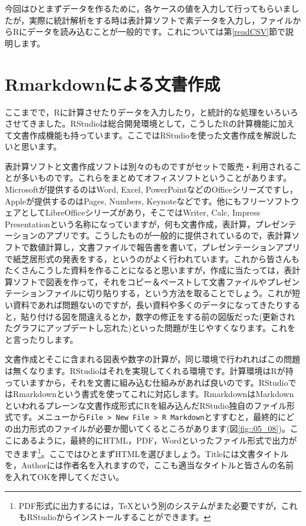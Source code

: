 \documentclass{ltjbook}
\begin{document}
今回はひとまずデータを作るために，各ケースの値を入力して行ってもらいましたが，実際に統計解析をする時は表計算ソフトで素データを入力し，ファイルからRにデータを読み込むことが一般的です。これについては第\ref{readCSV}節で説明します。

\section{Rmarkdownによる文書作成}
ここまでで，Rに計算させたりデータを入力したり，と統計的な処理をいろいろさせてきました。RStudioは総合開発環境として，こうしたRの計算機能に加えて文書作成機能も持っています。ここではRStudioを使った文書作成を解説したいと思います。

表計算ソフトと文書作成ソフトは別々のものですがセットで販売・利用されることが多いものです。これらをまとめてオフィスソフトということがあります。Microsoftが提供するのはWord, Excel, PowerPointなどのOfficeシリーズですし，Appleが提供するのはPages, Numbers, Keynoteなどです。他にもフリーソフトウェアとしてLibreOfficeシリーズがあり，そこではWriter, Calc, Impress Presentationという名称になっていますが，何も文書作成，表計算，プレゼンテーションのアプリです。こうしたものが一般的に提供されているので，表計算ソフトで数値計算し，文書ファイルで報告書を書いて，プレゼンテーションアプリで紙芝居形式の発表をする，というのがよく行われています。これから皆さんもたくさんこうした資料を作ることになると思いますが，作成に当たっては，表計算ソフトで図表を作って，それをコピー＆ペーストして文書ファイルやプレゼンテーションファイルに切り貼りする，という方法を取ることでしょう。これが短い資料であれば問題ないのですが，長い資料や多くのデータになってきたりすると，貼り付ける図を間違えるとか，数字の修正をする前の図版だった(更新されたグラフにアップデートし忘れた)といった問題が生じやすくなります。これをと言ったりします。

文書作成とそこに含まれる図表や数字の計算が，同じ環境で行われればこの問題は無くなります。RStudioはそれを実現してくれる環境です。計算環境はRが持っていますから，それを文書に組み込む仕組みがあれば良いのです。RStudioではRmarkdownという書式を使ってこれに対応します。RmarkdownはMarkdownといわれるプレーンな文書作成形式にRを組み込んだRStudio独自のファイル形式です。メニューから\verb|File > New File > R Markdown|とすすむと，最終的にどの出力形式のファイルが必要か聞いてくるところがあります(図\ref{fig::05_08})。ここにあるように，最終的にHTML，PDF，Wordといったファイル形式で出力ができます\footnote{PDF形式に出力するには，TeXという別のシステムがまた必要ですが，これもRStudioからインストールすることができます。}。ここではひとまずHTMLを選びましょう。Titleには文書タイトルを，Authorには作者名を入れますので，ここも適当なタイトルと皆さんの名前を入れてOKを押してください。
\end{document}
